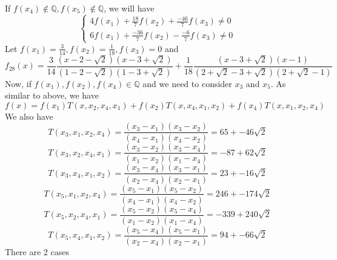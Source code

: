 \documentclass[english, 10pt]{article} %
\begin{document}
If $f(x_4) \not \in \mathbb{Q}, f(x_5) \not \in \mathbb{Q}$, we will have
$$\begin{cases}
4f(x_1)+\frac{18}{7}f(x_2)+\frac{-46}{7}f(x_3) \neq 0\\
6f(x_1)+\frac{-36}{7}f(x_2)-\frac{-6}{7}f(x_3) \neq 0
\end{cases}$$
Let $f(x_1)=\frac{3}{14}, f(x_2)=\frac{1}{18}, f(x_3)=0$ and
$$f_{28}(x) = \frac{3}{14}\frac{(x-2-\sqrt{2})(x-3+\sqrt{2})}{(1-2-\sqrt{2})(1-3+\sqrt{2})}+\frac{1}{18}\frac{(x-3+\sqrt{2})(x-1)}{(2+\sqrt{2}-3+\sqrt{2})(2+\sqrt{2}-1)}$$
Now, if $f(x_1),f(x_2),f(x_4) \in \mathbb{Q}$ and we need to consider $x_3$ and $x_5$. As similar to above, we have
$$f(x) = f(x_1)T(x,x_2,x_4,x_1)+f(x_2)T(x,x_4,x_1,x_2)+f(x_4)T(x,x_1,x_2,x_4)$$
We also have
$$T(x_3,x_1,x_2,x_4) = \frac{(x_3-x_1)(x_3-x_2)}{(x_4-x_1)(x_4-x_2)} = 65+-46\sqrt{2}$$
$$T(x_3,x_2,x_4,x_1) = \frac{(x_3-x_2)(x_3-x_4)}{(x_1-x_2)(x_1-x_4)} = -87+62\sqrt{2}$$
$$T(x_3,x_4,x_1,x_2) = \frac{(x_3-x_4)(x_3-x_1)}{(x_2-x_4)(x_2-x_1)}= 23+-16\sqrt{2}$$
$$T(x_5,x_1,x_2,x_4) = \frac{(x_5-x_1)(x_5-x_2)}{(x_4-x_1)(x_4-x_2)} = 246+-174\sqrt{2}$$
$$T(x_5,x_2,x_4,x_1) = \frac{(x_5-x_2)(x_5-x_4)}{(x_1-x_2)(x_1-x_4)} = -339+240\sqrt{2}$$
$$T(x_5,x_4,x_1,x_2) = \frac{(x_5-x_4)(x_5-x_1)}{(x_2-x_4)(x_2-x_1)}= 94+-66\sqrt{2}$$
There are 2 cases
\end{document}
